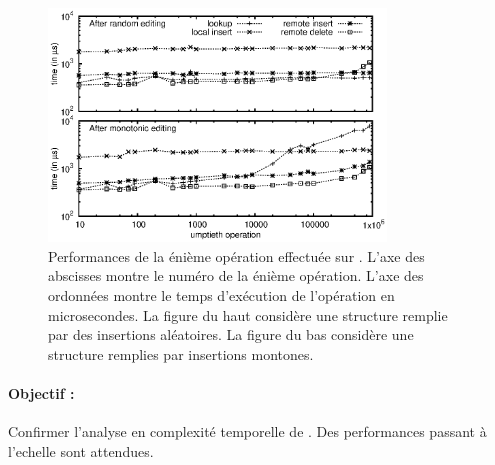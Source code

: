 \begin{figure}
  \begin{center}
    \includegraphics[width=0.8\textwidth]{img/lseq/time.eps}
    \caption{\label{repl:img:time} Performances de la énième opération effectuée
      sur \LSEQ. L'axe des abscisses montre le numéro de la énième
      opération. L'axe des ordonnées montre le temps d'exécution de l'opération
      en microsecondes. La figure du haut considère une structure remplie par
      des insertions aléatoires. La figure du bas considère une structure
      remplies par insertions montones.}
  \end{center}
\end{figure}

\paragraph{Objectif :} Confirmer l'analyse en complexité temporelle de
\LSEQ. Des performances passant à l'echelle sont attendues.

